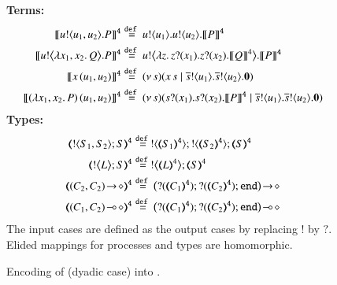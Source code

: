 
\begin{figure}[t]
{\bf Terms:} 
\begin{align*}
	 \pmap{\bout{u}{u_1, u_2} P}{4} &\defeq \bout{u}{u_1} \bout{u}{u_2} \pmap{P}{4}
	\\
	 \pmap{\bbout{u}{\abs{x_1, x_2} Q} P}{4} &\defeq \bbout{u}{\abs{z}\binp{z}{x_1} \binp{z}{x_2} \map{Q}^{4}} \pmap{P}{4} %
	\\
 \pmap{\appl{x}{(u_1, u_2)}}{4} &\defeq \newsp{s}{\appl{x}{s} \Par \bout{\dual{s}}{u_1}   \bout{\dual{s}}{u_2} \inact}
	\\
	\pmap{\appl{(\abs{x_1,x_2}{P})}{(u_1, u_2)}}{4} &\defeq
	\newsp{s}{\binp{s}{x_1}  \binp{s}{x_2} \pmap{P}{4} \Par \bout{\dual{s}}{u_1}  \bout{\dual{s}}{u_2} \inact} 
\end{align*}
{\bf Types:}
\begin{align*}
		\tmap{\btout{S_1, S_2}S}{4} &\defeq \btout{\tmap{S_1}{4}}  \btout{\tmap{S_2}{4}}\tmap{S}{4}
	\\
	 \tmap{\bbtout{L} S}{4} & \defeq  \bbtout{\mapt{L}^{4}}\mapt{S}^{4}
	\\
	  \tmap{\shot{(C_2,  C_2)}}{4} &\defeq \shot{\big(\btinp{\tmap{C_1}{4}} \btinp{\tmap{C_2}{4}}\tinact\big)}
	\\
	  \tmap{\lhot{(C_1,  C_2)}}{4} &\defeq \lhot{\big(\btinp{\tmap{C_1}{4}}  \btinp{\tmap{C_2}{4}}\tinact\big)}
\end{align*}
The input cases are defined as the output cases by replacing $!$ by $?$. 
Elided mappings for  processes and types are 
homomorphic.
\caption{\label{f:enc:poltomon}Encoding of \PHOp (dyadic case) into \HOp. }
\end{figure}

